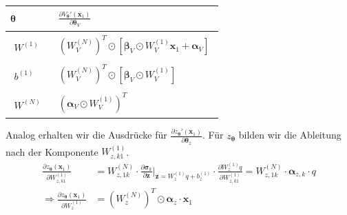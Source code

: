 \documentclass[a4paper, 12pt]{scrartcl}
\begin{document}
\begin{center}
    \begin{tabular}{l l}
        $\bm{\theta}$ 
        & 
        $\begin{aligned}
            \frac{\partial V_{\bm{\theta}}'(\bm{x}_1)}{\partial \bm{\theta}_V}
        \end{aligned}$
        \\[0.5em] \hline
        \noalign{\vspace{0.5em}}
        $\begin{aligned}
            W^{(1)}
        \end{aligned}$
        &
        $\begin{aligned}
            \left(W_V^{(N)}\right)^T 
            \odot
            \left[
                \bm{\beta}_V \odot W_V^{(1)} \bm{x}_1 
                +
                \bm{\alpha}_V
            \right]
        \end{aligned}$
        \\[0.5em] \hline
        \noalign{\vspace{0.5em}}
        $\begin{aligned}
            b^{(1)}
        \end{aligned}$
        &
        $\begin{aligned}
            \left(W_V^{(N)}\right)^T 
            \odot
            \left[
                \bm{\beta}_V \odot W_V^{(1)}
            \right]
        \end{aligned}$
        \\[0.5em] \hline
        \noalign{\vspace{0.5em}}
        $\begin{aligned}
            W^{(N)}
        \end{aligned}$
        &
        $\begin{aligned}
            \left(\bm{\alpha}_V \odot W_V^{(1)}\right)^T
        \end{aligned}$
    \end{tabular}
\end{center}

Analog erhalten wir die Ausdrücke für
$\frac{\partial z_{\bm{\theta}}'(\bm{x}_1)}{\partial \bm{\theta}_z}$. 
%
Für $z_{\bm{\theta}}$ bilden wir die Ableitung nach der Komponente $W_{z,k1}^{(1)}$.
%
\begin{align*}
    \frac{\partial z_{\bm{\theta}}(\bm{x}_1)}{\partial W^{(1)}_{z,k1}}
    &=
    W_{z,1k}^{(N)} 
    \cdot
    \frac{\partial \bm{\sigma}_k}{\partial \bm{z}} \bigg|_{\bm{z}=W_z^{(1)}q + b^{(1)}_z}
    \cdot
    \frac{\partial W_z^{(1)}q}{\partial W^{(1)}_{z,k1}}
    =
    W_{z,1k}^{(N)}
    \cdot 
    \bm{\alpha}_{z,k} \cdot q
    \\
    \Rightarrow
    \frac{\partial z_{\bm{\theta}}(\bm{x}_1)}{\partial W^{(1)}_{z}}
    &=
    \left(W_{z}^{(N)}\right)^T
    \odot 
    \bm{\alpha}_{z} \cdot \bm{x}_1
\end{align*}
\end{document}
